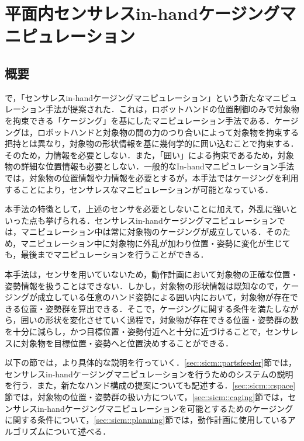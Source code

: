 \documentclass[a4paper,twoside,12pt,papersize, dvipdfmx]{iirthesis}
\begin{document}
    \newcommand{\figref}[1]{\figurename\ref{#1}}
    \newcommand{\tabref}[1]{\tablename\ref{#1}}
    \renewcommand{\eqref}[1]{式~(\ref{#1})}
    \newcommand{\chapref}[1]{\ref{#1}章}
    \newcommand{\secref}[1]{\ref{#1}節}
    \newcommand{\ssecref}[1]{\ref{#1}項}
    \newcommand{\appref}[1]{付録\ref{#1}}
\fi


\chapter{平面内センサレスin-handケージングマニピュレーション}\label{chap::sicm}
\minitoc

\section{概要}
\cite{asamura2013}で，「センサレスin-handケージングマニピュレーション」という新たなマニピュレーション手法が提案された．これは，ロボットハンドの位置制御のみで対象物を拘束できる「ケージング」\cite{rimon1999}を基にしたマニピュレーション手法である．ケージングは，ロボットハンドと対象物の間の力のつり合いによって対象物を拘束する把持とは異なり，対象物の形状情報を基に幾何学的に囲い込むことで拘束する．そのため，力情報を必要としない．また，「囲い」による拘束であるため，対象物の詳細な位置情報も必要としない．一般的なIn-handマニピュレーション手法では，対象物の位置情報や力情報を必要とするが，本手法ではケージングを利用することにより，センサレスなマニピュレーションが可能となっている．\par
本手法の特徴として，上述のセンサを必要としないことに加えて，外乱に強いといった点も挙げられる．センサレスin-handケージングマニピュレーションでは，マニピュレーション中は常に対象物のケージングが成立している．そのため，マニピュレーション中に対象物に外乱が加わり位置・姿勢に変化が生じても，最後までマニピュレーションを行うことができる．\par
本手法は，センサを用いていないため，動作計画において対象物の正確な位置・姿勢情報を扱うことはできない．しかし，対象物の形状情報は既知なので，ケージングが成立している任意のハンド姿勢による囲い内において，対象物が存在できる位置・姿勢群を算出できる．そこで，ケージングに関する条件を満たしながら，囲いの形状を変化させていく過程で，対象物が存在できる位置・姿勢群の数を十分に減らし，かつ目標位置・姿勢付近へと十分に近づけることで，センサレスに対象物を目標位置・姿勢へと位置決めすることができる．\par
以下の節では，より具体的な説明を行っていく．\secref{sec::sicm::partsfeeder}では，センサレスin-handケージングマニピュレーションを行うためのシステムの説明を行う．また，新たなハンド構成の提案についても記述する．\secref{sec::sicm::cspace}では，対象物の位置・姿勢群の扱い方について，\secref{sec::sicm::caging}では，センサレスin-handケージングマニピュレーションを可能とするためのケージングに関する条件について，\secref{sec::sicm::planning}では，動作計画に使用しているアルゴリズムについて述べる．
\end{document}
